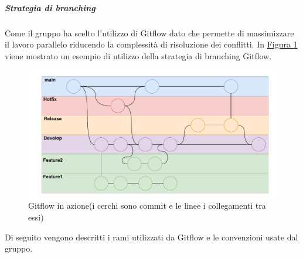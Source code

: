 \subparagraph{Strategia di branching}
\label{subpar:strategia_di_branching_documenti}
Come  il gruppo ha scelto l'utilizzo di Gitflow dato che permette di massimizzare il lavoro parallelo riducendo la complessità di risoluzione dei conflitti.
In \hyperref[fig:gitflow]{Figura \ref{fig:gitflow}} viene mostrato un esempio di utilizzo della strategia di branching Gitflow.
\begin{figure}[!h]
    \includegraphics[scale=0.65]{Sezioni/ProcessiDiSupporto/Immagini/gitflow.pdf}
    \caption{Gitflow in azione(i cerchi sono commit e le linee i collegamenti tra essi)}
    \label{fig:gitflow}
\end{figure}
Di seguito vengono descritti i rami utilizzati da Gitflow e le convenzioni usate dal gruppo.
